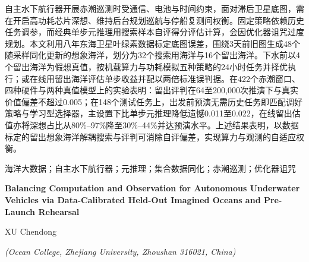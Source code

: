 自主水下航行器开展赤潮巡测时受通信、电池与时间约束，面对滞后卫星底图，需在开启高功耗芯片深想、维持后台规划巡航与停船复测间权衡。固定策略依赖历史任务调参，而经典单步元推理用搜索样本自评得分评估计算，会因优化器诅咒过度规划。本文利用八年东海卫星叶绿素数据标定底图误差，围绕3天前旧图生成48个随采样同化更新的想象海洋，划分为32个搜索用海洋与16个留出海洋。下水前以4个留出海洋为假想真值，按机载算力与功耗模拟五种策略的24小时任务并择优执行；或在线用留出海洋评估单步收益并配以两倍标准误判据。在422个赤潮窗口、四种硬件与两种真值模型上的实验表明：留出评判在64至200,000次推演下与真实价值偏差不超过0.005；在148个测试任务上，出发前预演无需历史任务即匹配调好策略与学习型选择器，主设置下比单步元推理降低遗憾0.011至0.022，在线留出估值亦将深想占比从80\%--97\%降至30\%--44\%并达预演水平。上述结果表明，以数据标定的留出想象海洋解耦搜索与评判可消除自评偏差，实现算力与观测的自适应权衡。

\vspace{4pt}
海洋大数据；自主水下航行器；元推理；集合数据同化；赤潮巡测；优化器诅咒

\vspace{10pt}
\begin{center}
  {\bfseries Balancing Computation and Observation for Autonomous Underwater Vehicles via Data-Calibrated Held-Out Imagined Oceans and Pre-Launch Rehearsal\par}
  \vspace{4pt}
  { XU Chendong\par}
  {\itshape (Ocean College, Zhejiang University, Zhoushan 316021, China)\par}
\end{center}
\vspace{4pt}

